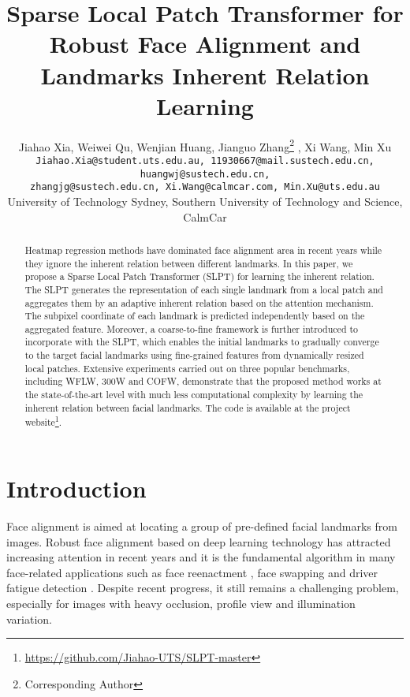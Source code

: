 \documentclass[10pt,twocolumn,letterpaper]{article}
\begin{document}
\title{Sparse Local Patch Transformer for Robust Face Alignment and Landmarks Inherent Relation Learning}

\author{Jiahao Xia, Weiwei Qu, Wenjian Huang, Jianguo Zhang\thanks{Corresponding Author} , Xi Wang, Min Xu\footnotemark[1] \\
{\tt\small Jiahao.Xia@student.uts.edu.au, 11930667@mail.sustech.edu.cn, huangwj@sustech.edu.cn,} \\
{\tt\small zhangjg@sustech.edu.cn, Xi.Wang@calmcar.com, Min.Xu@uts.edu.au}\\
{\footnotesize University of Technology Sydney, Southern University of Technology and Science, CalmCar}\\
}
\maketitle

\begin{abstract}


   Heatmap regression methods have dominated face alignment area in recent years while they ignore the inherent relation between different landmarks. In this paper, we propose a Sparse Local Patch Transformer (SLPT) for learning the inherent relation. The SLPT generates the representation of each single landmark from a local patch and aggregates them by an adaptive inherent relation based on the attention mechanism. The subpixel coordinate of each landmark is predicted independently based on the aggregated feature. Moreover, a coarse-to-fine framework is further introduced to incorporate with the SLPT, which enables the initial landmarks to gradually converge to the target facial landmarks using fine-grained features from dynamically resized local patches. Extensive experiments carried out on three popular benchmarks, including WFLW, 300W and COFW, demonstrate that the proposed method works at the state-of-the-art level with much less computational complexity by learning the inherent relation between facial landmarks. The code is available at the project website\footnote{\url{https://github.com/Jiahao-UTS/SLPT-master}}.
   
\end{abstract}

\section{Introduction}
\label{sec:intro}

Face alignment is aimed at locating a group of pre-defined facial landmarks from images. Robust face alignment based on deep learning technology has attracted increasing attention in recent years and it is the fundamental algorithm in many face-related applications such as face reenactment \cite{FreeNet}, face swapping \cite{AHF} and driver fatigue detection \cite{Fatigue}. Despite recent progress, it still remains a challenging problem, especially for images with heavy occlusion, profile view and illumination variation.
\end{document}
